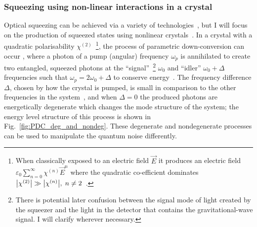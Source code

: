 \subsubsection{Squeezing using non-linear interactions in a crystal}
Optical squeezing can be achieved via a variety of technologies~\cite{}, but I will focus on the production of squeezed states using nonlinear crystals~\cite{}. In a crystal with a quadratic polarisability $\chi^{(2)}$~\footnote{When classically exposed to an electric field $\vec E$ it produces an electric field $\varepsilon_0 \sum_{n=0}^\infty \chi^{(n)} {\vec E}^n$  where the quadratic co-efficient dominates $\abs{\chi^{(2)}}\gg\abs{\chi^{(n)}},\; n\neq2$~\cite{theresNoRefinKirkthesis?}.}, the process of parametric down-conversion can occur , where a photon of a  pump (angular) frequency $\omega_p$ is annihilated to create two entangled, squeezed photons at the ``signal''~\footnote{There is potential later confusion between the signal mode of light created by the squeezer and the light in the detector that contains the gravitational-wave signal. I will clarify wherever necessary.} $\omega_0$ and ``idler'' $\omega_0+\Delta$ frequencies such that $\omega_p=2\omega_0+\Delta$ to conserve energy~\cite{}. The frequency difference $\Delta$, chosen by how the crystal is pumped, is small in comparison to the other frequencies in the system~\cite{}, and when $\Delta=0$ the produced photons are energetically degenerate which changes the mode structure of the system; the energy level structure of this process is shown in Fig.~\ref{fig:PDC_deg_and_nondeg}. %
These degenerate and nondegenerate processes can be used to manipulate the quantum noise differently. %



